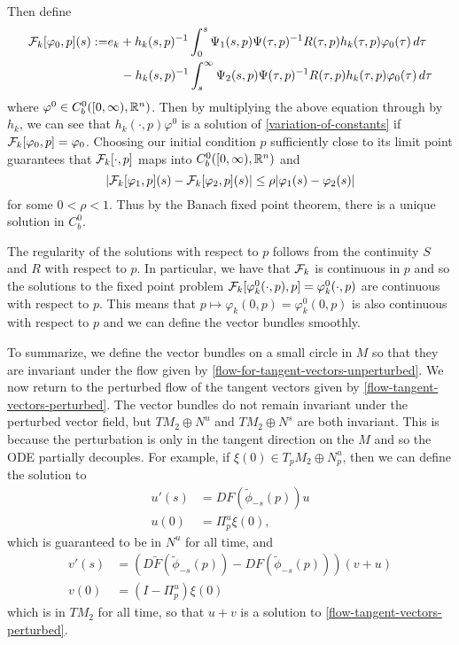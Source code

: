 Then define
\begin{equation}
\begin{aligned}
	\mathcal{F}_k[\varphi_0, p](s) :=& e_k + h_k(s,p)^{-1}\int_0^s \Psi_1(s, p) \Psi(\tau, p)^{-1}R(\tau, p) h_k(\tau,p)\varphi_0(\tau)\, d\tau \\
	&\quad - h_k(s,p)^{-1}\int_s^\infty \Psi_2(s,p) \Psi(\tau, p)^{-1} R(\tau, p)h_k(\tau,p) \varphi_0(\tau)\, d\tau
\end{aligned}
\end{equation}
where \(\varphi^0\in C^0_b([0,\infty), \mathbb{R}^n)\). Then by multiplying the above equation through by \(h_k\), we can see that \(h_k(\cdot, p)\varphi^0\) is a solution of \cref{variation-of-constants} if \(\mathcal{F}_k[\varphi_0, p] = \varphi_0\). Choosing our initial condition \(p\) sufficiently close to its limit point guarantees that \(\mathcal{F}_k[\cdot, p]\) maps into \(C^0_b([0,\infty), \mathbb{R}^n)\) and
\begin{equation}
	|\mathcal{F}_k[\varphi_1, p](s) - \mathcal{F}_k[\varphi_2, p](s) | \leq \rho  |\varphi_1(s) - \varphi_2(s)| 
\end{equation}
for some \(0< \rho < 1\). Thus by the Banach fixed point theorem, there is a unique solution in \(C^0_b\).

The regularity of the solutions with respect to \(p\) follows from the continuity \(S\) and \(R\) with respect to \(p\). In particular, we have that \(\mathcal{F}_k\) is continuous in \(p\) and so the solutions to the fixed point problem \(\mathcal{F}_k[\varphi_k^0(\cdot, p) , p] = \varphi_k^0(\cdot, p)\) are continuous with respect to \(p\). This means that \(p\mapsto \varphi_k(0,p) = \varphi_k^0(0,p) \) is also continuous with respect to \(p\) and we can define the vector bundles smoothly.

To summarize, we define the vector bundles on a small circle in \(M\) so that they are invariant under the flow given by \cref{flow-for-tangent-vectors-unperturbed}. We now return to the perturbed flow of the tangent vectors given by \cref{flow-tangent-vectors-perturbed}. The vector bundles do not remain invariant under the perturbed vector field, but \(TM_2 \oplus N^u\) and \(TM_2 \oplus N^s\) are both invariant. This is because the perturbation is only in the tangent direction on the \(M\) and so the ODE partially decouples. For example, if \(\xi(0) \in T_pM_2 \oplus N^u_p\), then we can define the solution to 
\begin{equation}
\begin{aligned}
	u'(s) &= DF(\tilde \phi_{-s}(p)) u\\
	u(0) &= \Pi^u_p \xi(0),
\end{aligned}
\end{equation}
which is guaranteed to be in \(N^u\) for all time, and 
\begin{equation}
\begin{aligned}
	v'(s) &= (D\tilde F(\tilde\phi_{-s}(p)) - DF(\tilde\phi_{-s}(p))) (v + u) \\
	v(0) &= (I - \Pi^u_p) \xi(0)
\end{aligned}
\end{equation}
which is in \(TM_2\) for all time, so that \(u + v\) is a solution to \cref{flow-tangent-vectors-perturbed}.